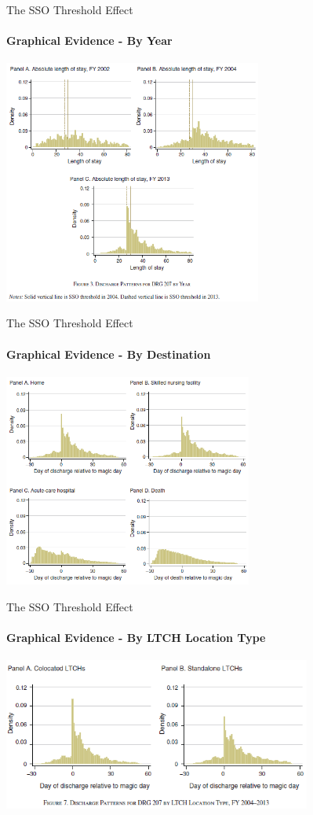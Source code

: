 \documentclass{beamer}
\begin{document}
\begin{frame}{The SSO Threshold Effect}
\framesubtitle{Graphical Evidence - By Year}
\begin{center}
\includegraphics[height=8cm]{graph_evi_across_time}
\end{center}
\end{frame}

\begin{frame}{The SSO Threshold Effect}
\framesubtitle{Graphical Evidence - By Destination}
\begin{center}
\includegraphics[height=7cm]{graph_evi_dest}
\end{center}
\end{frame}

\begin{frame}{The SSO Threshold Effect}
\framesubtitle{Graphical Evidence - By LTCH Location Type}
\begin{center}
\includegraphics[height=5cm]{graph_evi_loc}
\end{center}
\end{frame}
\end{document}

